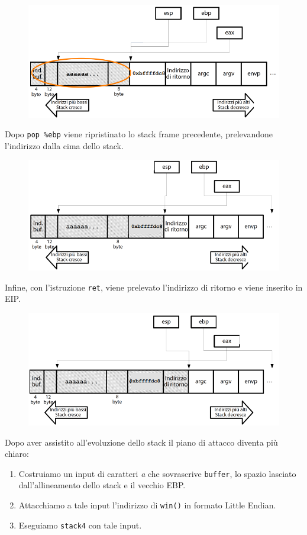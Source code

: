 \begin{figure}[hbpt!]
    \centering
    \includegraphics[width= 0.6 \textwidth]{./Images/cap7/7.16.png}
\end{figure}
\FloatBarrier

Dopo \texttt{pop \%ebp} viene ripristinato lo stack frame precedente, prelevandone l'indirizzo dalla cima dello stack.

\begin{figure}[hbpt!]
    \centering
    \includegraphics[width= 0.6 \textwidth]{./Images/cap7/7.17.png}
\end{figure}
\FloatBarrier

Infine, con l'istruzione \texttt{ret}, viene prelevato l'indirizzo di ritorno e viene inserito in EIP.

\begin{figure}[hbpt!]
    \centering
    \includegraphics[width= 0.6 \textwidth]{./Images/cap7/7.18.png}
\end{figure}
\FloatBarrier

Dopo aver assistito all'evoluzione dello stack il piano di attacco diventa più chiaro:
\begin{enumerate}
    \item Costruiamo un input di caratteri \textit{a} che sovrascrive \texttt{buffer}, lo spazio lasciato dall'allineamento dello stack e il vecchio EBP.
    \item Attacchiamo a tale input l'indirizzo di \texttt{win()} in formato Little Endian.
    \item Eseguiamo \texttt{stack4} con tale input.
\end{enumerate}

